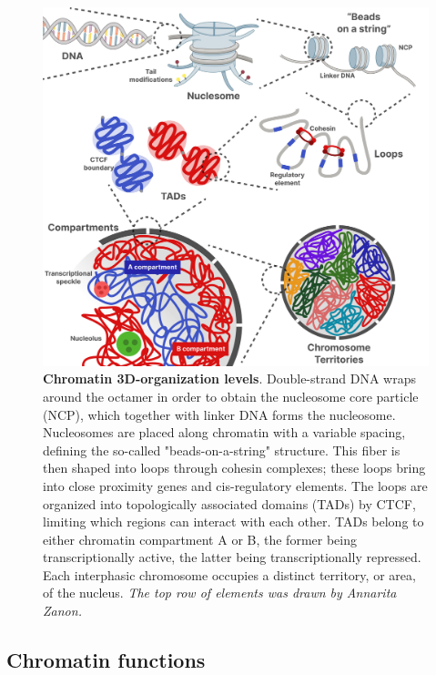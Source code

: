 \begin{figure}[ht]
  \centering
  \includegraphics[width=1\textwidth]{chromatin_organization.png}
  \caption{\textbf{Chromatin 3D-organization levels}. Double-strand DNA wraps around the octamer in order to obtain the nucleosome core particle (NCP), which together with linker DNA forms the nucleosome. Nucleosomes are placed along chromatin with a variable spacing, defining the so-called "beads-on-a-string" structure. This fiber is then shaped into loops through cohesin complexes; these loops bring into close proximity genes and cis-regulatory elements. The loops are organized into topologically associated domains (TADs) by CTCF, limiting which regions can interact with each other. TADs belong to either chromatin compartment A or B, the former being transcriptionally active, the latter being transcriptionally repressed. Each interphasic chromosome occupies a distinct territory, or area, of the nucleus. \textit{The top row of elements was drawn by Annarita Zanon.}}
  \label{fig:chromatin}
\end{figure}

\subsection{Chromatin functions}

